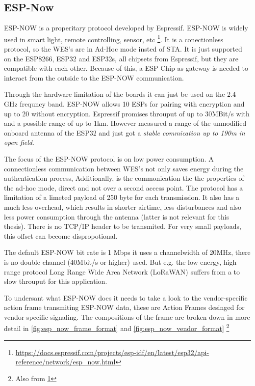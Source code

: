 \subsection*{ESP-Now}
\label{sub:espnow}
ESP-NOW is a properitary protocol developed by Espressif. 
ESP-NOW is widely used in smart light, remote controlling, sensor, etc
\footnote{\url{https://docs.espressif.com/projects/esp-idf/en/latest/esp32/api-reference/network/esp_now.html}\label{note:espressif}}.
It is a conectionless protocol, so the \ac{WES}'s are in Ad-Hoc mode insted of \ac{STA}.
It is just supported on the ESP8266, ESP32 and ESP32s, all chipsets from Espressif, but they are compatible with each other.
Because of this, a ESP-Chip as gateway is needed to interact from the outside to the ESP-NOW communication. 

Through the hardware limitation of the boards it can just be used on the 2.4 GHz frequncy band.
ESP-NOW allows 10 ESPs for pairing with encryption and up to 20 without encryption.
Espressif promises throuput of up to 30MBit/s with and a possible range of up to 1km.
However \emph{\textcite{ESPNOWPaper}} measured a range of the unmodified onboard antenna of the ESP32 
and just got a \emph{\textcite{ESPNOWPaper} stable commication up to 190m in open field}.

The focus of the ESP-NOW protocol is on low power consumption.
A connectionless communication between \ac{WES}'s not only saves energy during the authentication process, 
Additionally, is the commonication the the properties of the ad-hoc mode, direct and not over a second access point.
The protocol has a limitation of a limeted payload of 250 byte for each transmission.
It also has a much less overhead, which results in shorter airtime, less disturbances and also less power consumption through the antenna 
(latter is not relevant for this thesis).
There is no TCP/IP header to be transmited. 
For very small payloads, this offset can become dispropotional.

The default ESP-NOW bit rate is 1 Mbps it uses a channelwidth of 20MHz, there is no double channel (40Mbit/s or higher) used.
But e.g. the low energy, high range protocol Long Range Wide Area Network (LoRaWAN) suffers from a to slow throuput for this application.

To undersant what ESP-NOW does it needs to take a look to the vendor-specific action frame transmiting ESP-NOW data,
these are Action Frames desinged for vendor-specific signaling.
The compositions of the frame are broken down in more detail in \cref{fig:esp_now_frame_format} and \cref{fig:esp_now_vendor_format}
\footnote{Also from \ref{note:espressif}}

